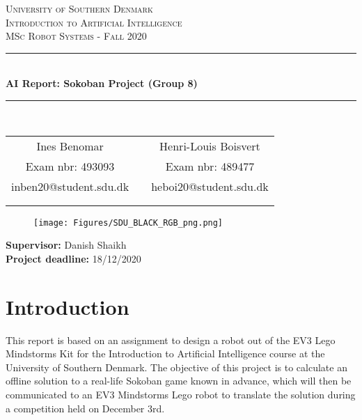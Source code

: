 \documentclass[a4paper,12pt]{article}
\begin{document}
\cfoot[]{ \fancyplain{}{\footnotesize} }
\fancyhead{}


\begin{titlepage}
\begin{center}
\textsc{\LARGE University of Southern Denmark}\\[1.5cm]

\textsc{Introduction to Artificial Intelligence}\\[0.5cm]

\textsc{\large MSc Robot Systems - Fall 2020}\\[0.5cm]
\rule{\linewidth}{0.5mm}\\[0.4cm]
{ \LARGE \bfseries AI Report: Sokoban Project (Group 8) \\[0.4cm]}
\rule{\linewidth}{0.5mm}\\[1.2cm]

\begin{tabular}{c c c}
	Ines Benomar     &   & Henri-Louis Boisvert\\
	Exam nbr: 493093    &   &  Exam nbr: 489477\\
	inben20@student.sdu.dk  &   & heboi20@student.sdu.dk \\
    \\
        	\cline{1-1}\cline{3-3}

        	\\
\end{tabular}

\vfill
\begin{figure}[H]
\centering
\texttt{[image: Figures/SDU\_BLACK\_RGB\_png.png]}
\end{figure}
\vfill

\textbf{Supervisor:} Danish Shaikh\\ [0.5cm]

\textbf{Project deadline:} 18/12/2020

\end{center}
\end{titlepage}
\clearpage

\tableofcontents
\newpage


\section{Introduction}

This report is based on an assignment to design a robot out of the EV3 Lego Mindstorms Kit for the Introduction to Artificial Intelligence course at the University of Southern Denmark. The objective of this project is to calculate an offline solution to a real-life Sokoban game known in advance, which will then be communicated to an EV3 Mindstorms Lego robot to translate the solution during a competition held on December 3rd.
\end{document}
